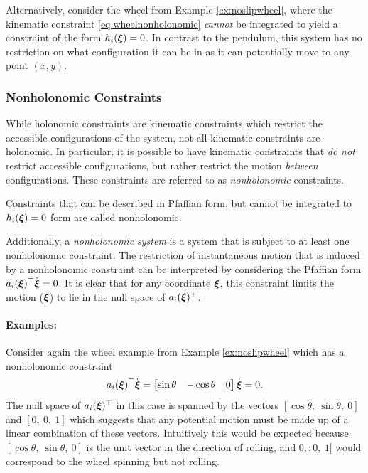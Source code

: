 Alternatively, consider the wheel from Example \ref{ex:noslipwheel}, where the kinematic constraint \eqref{eq:wheelnonholonomic} \textit{cannot} be integrated to yield a constraint of the form $h_i(\bm{\xi}) = 0$. In contrast to the pendulum, this system has no restriction on what configuration it can be in as it can potentially move to any point $(x,y)$.


\subsubsection{Nonholonomic Constraints}
While holonomic constraints are kinematic constraints which restrict the accessible configurations of the system, not all kinematic constraints are holonomic. In particular, it is possible to have kinematic constraints that \textit{do not} restrict accessible configurations, but rather restrict the motion \textit{between} configurations. These constraints are referred to as \textit{nonholonomic} constraints.

\begin{definition} 
Constraints that can be described in Pfaffian form, but cannot be integrated to $h_i(\bm{\xi}) = 0 $ form are called nonholonomic.
\end{definition}
Additionally, a \textit{nonholonomic system} is a system that is subject to at least one nonholonomic constraint.
The restriction of instantaneous motion that is induced by a nonholonomic constraint can be interpreted by considering the Pfaffian form $a_i(\bm{\xi})^\top \dot{\bm{\xi}} = 0$. It is clear that for any coordinate $\bm{\xi}$, this constraint limits the motion ($\dot{\bm{\xi}}$) to lie in the null space of $a_i(\bm{\xi})^\top $.

\paragraph{Examples:}
Consider again the wheel example from Example \ref{ex:noslipwheel} which has a nonholonomic constraint
\begin{equation*}
a_i(\bm{\xi})^\top \dot{\bm{\xi}} = \begin{bmatrix}
\sin \theta & -\cos \theta & 0
\end{bmatrix}\dot{\bm{\xi}}=0.
\end{equation*}
The null space of $a_i(\bm{\xi})^\top $ in this case is spanned by the vectors $[\cos \theta, \: \sin \theta,\: 0]$ and $[0, \: 0,\: 1]$ which suggests that any potential motion must be made up of a linear combination of these vectors. Intuitively this would be expected because $[\cos \theta, \: \sin \theta,\: 0]$ is the unit vector in the direction of rolling, and $0, : 0,\: 1]$ would correspond to the wheel spinning but not rolling. 

